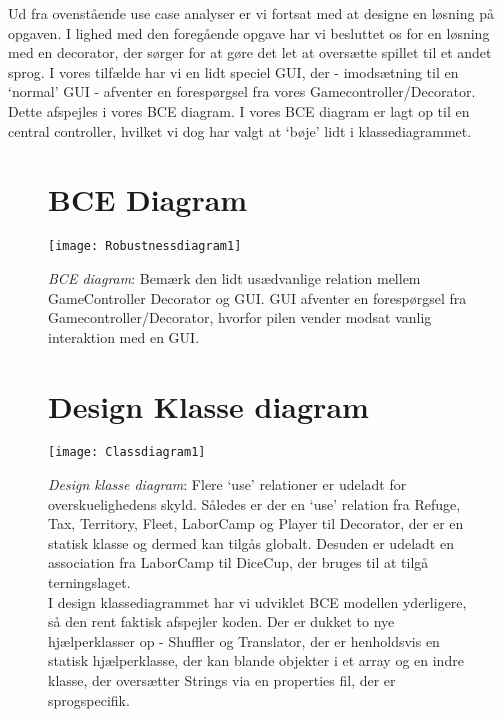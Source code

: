 Ud fra ovenstående use case analyser er vi fortsat med at designe en løsning på
opgaven. I lighed med den foregående opgave har vi besluttet os for en løsning
med en decorator, der sørger for at gøre det let at oversætte spillet til et
andet sprog. I vores tilfælde har vi en lidt speciel GUI, der - imodsætning til
en ‘normal’ GUI - afventer en forespørgsel fra vores Gamecontroller/Decorator.
Dette afspejles i vores BCE diagram. I vores BCE diagram er lagt op til en
central controller, hvilket vi dog har valgt at ‘bøje’ lidt i
klassediagrammet.\\
\FloatBarrier
\begin{figure}[h]
\section*{BCE Diagram}
\centering
\noindent \texttt{[image: Robustnessdiagram1]}
\caption{\emph{BCE diagram}: Bemærk den lidt usædvanlige
relation mellem GameController Decorator og GUI. GUI afventer en forespørgsel
fra Gamecontroller/Decorator, hvorfor pilen vender modsat vanlig interaktion med
en GUI.}
\end{figure}
\FloatBarrier
\begin{figure}[h]
\section*{Design Klasse diagram}
\centering
\noindent \texttt{[image: Classdiagram1]}
\caption{\emph{Design klasse diagram}: Flere ‘use’ relationer er udeladt for
overskuelighedens skyld. Således er der en ‘use’ relation fra Refuge, Tax,
Territory, Fleet, LaborCamp og Player til Decorator, der er en statisk klasse og
dermed kan tilgås globalt. Desuden er udeladt en association fra LaborCamp til
DiceCup, der bruges til at tilgå terningslaget.\\
I design klassediagrammet har vi udviklet BCE modellen yderligere, så
den rent faktisk afspejler koden. Der er dukket to nye hjælperklasser op - Shuffler og
Translator, der er henholdsvis en statisk hjælperklasse, der kan blande objekter
i et array og en indre klasse, der oversætter Strings via en properties fil,
der er sprogspecifik.}
\end{figure}
\FloatBarrier
